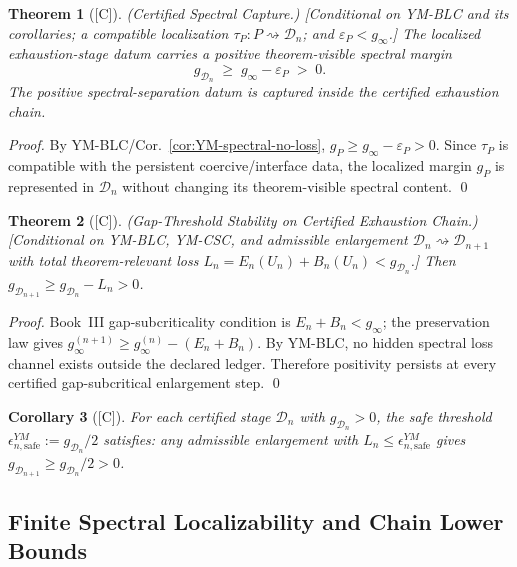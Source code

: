 \documentclass[12pt,oneside]{amsbook}
\theoremstyle{plain}
\newtheorem{theorem}{Theorem}[section]
\newtheorem{corollary}[theorem]{Corollary}
\theoremstyle{definition}
\theoremstyle{remark}
\newcommand{\status}[1]{\textup{[#1]}}
\begin{document}
\begin{theorem}[\status{C}]\label{thm:YM-CSC}
\textup{(Certified Spectral Capture.)}
\textup{[Conditional on YM-BLC and its corollaries; a compatible
localization $\tau_P : P \rightsquigarrow \mathcal{D}_n$; and
$\varepsilon_P < g_\infty$.]}
The localized exhaustion-stage datum carries a positive
theorem-visible spectral margin
\[
 g_{\mathcal{D}_n} \;\ge\; g_\infty - \varepsilon_P \;>\; 0.
\]
The positive spectral-separation datum is captured inside the
certified exhaustion chain.
\end{theorem}

\begin{proof}
By YM-BLC/Cor.~\ref{cor:YM-spectral-no-loss}, $g_P \ge g_\infty -
\varepsilon_P > 0$.  Since $\tau_P$ is compatible with the persistent
coercive/interface data, the localized margin $g_P$ is represented in
$\mathcal{D}_n$ without changing its theorem-visible spectral content.
\qed
\end{proof}

\begin{theorem}[\status{C}]\label{thm:YM-GTS}
\textup{(Gap-Threshold Stability on Certified Exhaustion Chain.)}
\textup{[Conditional on YM-BLC, YM-CSC, and admissible enlargement
$\mathcal{D}_n \rightsquigarrow \mathcal{D}_{n+1}$ with total
theorem-relevant loss $L_n = E_n(U_n) + B_n(U_n) < g_{\mathcal{D}_n}$.]}
Then
$g_{\mathcal{D}_{n+1}} \ge g_{\mathcal{D}_n} - L_n > 0$.
\end{theorem}

\begin{proof}
Book~III gap-subcriticality condition is $E_n + B_n < g_\infty$;
the preservation law gives $g_\infty^{(n+1)} \ge g_\infty^{(n)} -
(E_n + B_n)$. By YM-BLC, no hidden spectral loss channel exists
outside the declared ledger. Therefore positivity persists at every
certified gap-subcritical enlargement step.
\qed
\end{proof}

\begin{corollary}[\status{C}]\label{cor:YM-GTS-threshold}
For each certified stage $\mathcal{D}_n$ with $g_{\mathcal{D}_n} > 0$,
the safe threshold $\epsilon_{n,\mathrm{safe}}^{YM} := g_{\mathcal{D}_n}/2$
satisfies: any admissible enlargement with $L_n \le \epsilon_{n,\mathrm{safe}}^{YM}$
gives $g_{\mathcal{D}_{n+1}} \ge g_{\mathcal{D}_n}/2 > 0$.
\end{corollary}

\subsection{Finite Spectral Localizability and Chain Lower Bounds}
\end{document}
